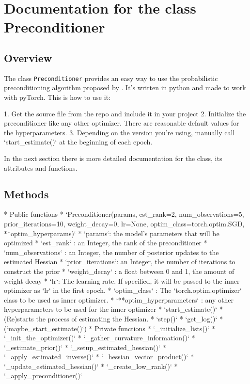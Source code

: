 \documentclass[twoside,12pt,a4paper]{report}
\begin{document}
\section{Documentation for the class Preconditioner}
\subsection{Overview}
The class \verb|Preconditioner| provides an easy way to use the probabilistic preconditioning algorithm proposed by \cite{roos2019active}. It's written in python and made to work with pyTorch.
This is how to use it:

\begin{markdown}
1. Get the source file from the repo and include it in your project
2. Initialize the preconditioner like any other optimizer. There are reasonable default values for the hyperparameters.
3. Depending on the version you're using, manually call `start_estimate()` at the beginning of each epoch.

In the next section there is more detailed documentation for the class, its attributes and functions.
\end{markdown}

\subsection{Methods}
\begin{markdown}
* Public functions
	* `Preconditioner(params, est_rank=2, num_observations=5, prior_iterations=10, weight_decay=0, lr=None,
	optim_class=torch.optim.SGD, **optim_hyperparams)`
		* `params`: the model's parameters that will be optimized
		* `est_rank` : an Integer, the rank of the preconditioner
		* `num_observations` : an Integer, the number of posterior updates to the estimated Hessian
		* `prior_iterations`: an Integer, the number of iterations to construct the prior
		* `weight_decay` : a float between 0 and 1, the amount of weight decay
		* `lr`: The learning rate. If specified, it will be passed to the inner optimizer as `lr` in the first epoch.
		* `optim_class` : The `torch.optim.optimizer` class to be used as inner optimizer.
		* `**optim_hyperparameters` : any other hyperparameters to be used for the inner optimizer
	* `start_estimate()`
		* (Re)starts the process of estimating the Hessian.
	* `step()`
	* `get_log()`
	* (`maybe_start_estimate()`)
* Private functions
	* `_initialize_lists()`
	* `_init_the_optimizer()`
	* `_gather_curvature_information()`
	* `_estimate_prior()`
	* `_setup_estimated_hessian()`
	* `_apply_estimated_inverse()`
	* `_hessian_vector_product()`
	* `_update_estimated_hessian()`
	* `_create_low_rank()`
	* `_apply_preconditioner()`
	
\end{markdown}
\end{document}

